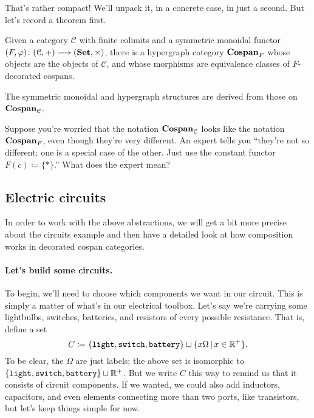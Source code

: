 \documentclass[7Sketches]{subfiles}
\begin{document}
That's rather compact! We'll unpack it, in a concrete case, in just a second.
But let's record a theorem first.

\begin{theorem}%
\label{thm.hypergraph_from_deccospan}
  Given a category $\mathcal C$ with finite colimits and a symmetric
  monoidal functor $(F,\varphi)\colon  (\mathcal C,+) \longrightarrow (\mathbf{Set}, \times)$,
  there is a hypergraph category $\mathbf{Cospan}_{F}$ whose objects are the objects of
  $\mathcal C$, and whose morphisms are equivalence classes of $F$-decorated cospans. 
  

  The symmetric monoidal and hypergraph structures are derived from those on
  $\mathbf{Cospan}_{\mathcal{C}}$.
\end{theorem}

\begin{exercise} %
\label{exc.cospan_as_fcospan}
	Suppose you're worried that the notation $\mathbf{Cospan}_{\mathcal{C}}$ looks like the notation $\mathbf{Cospan}_{F}$, even though they're very different. An expert tells you ``they're not so different; one is a special case of the other. Just use the constant functor $F(c)\coloneqq\{*\}$.'' What does the expert mean? 
\end{exercise}

\subsection{Electric circuits} %
\label{subsec.circuits}

In order to work with the above abstractions, we will get a bit more precise
about the circuits example and then have a detailed look at how composition
works in decorated cospan categories.

\paragraph{Let's build some circuits.}

To begin, we'll need to choose which components we want in our circuit. This is
simply a matter of what's in our electrical toolbox. Let's say we're carrying some
lightbulbs, switches, batteries, and resistors of every possible resistance. That is, define a set
\[
  C \coloneq \{\texttt{light},\texttt{switch},\texttt{battery}\} \sqcup \{x\Omega \,|\, x \in \mathbb{R}^+\}.
\]
To be clear, the $\Omega$ are just labels; the above set is isomorphic to
$\{\texttt{light},\texttt{switch},\texttt{battery}\}\sqcup \mathbb{R}^+$. But we write $C$ this way to remind
us that it consists of circuit components. If we wanted, we could also add
inductors, capacitors, and even elements connecting more than two ports, like
transistors, but let's keep things simple for now.
\end{document}
